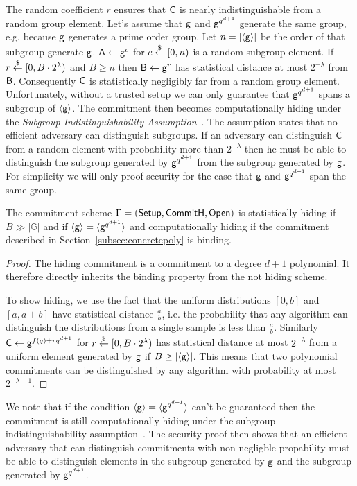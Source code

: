 The random coefficient $r$ ensures that $\mathsf{C}$ is nearly indistinguishable from a random group element. Let's assume that $\mathsf{g}$ and $\mathsf{g}^{q^{d+1}}$ generate the same group, e.g. because $\mathsf{g}$ generates a prime order group. Let $n=|\langle \mathsf{g}\rangle|$ be the order of that subgroup generate $\mathsf{g}$. $\mathsf{A}\gets\mathsf{g}^c$ for $c\overset{\$}{\gets} [0,n)$ is a random subgroup element. If $r \overset{\$}{\gets} [0,B\cdot 2^\lambda)$ and $B\geq n$ then $\mathsf{B}\gets \mathsf{g}^r$ has statistical distance at most $2^{-\lambda}$ from $\mathsf{B}$. Consequently $\mathsf{C}$ is statistically negligibly far from a random group element. 
 Unfortunately, without a trusted setup we can only guarantee that $\mathsf{g}^{q^{d+1}}$ spans a subgroup of $\langle \mathsf{g} \rangle$. The commitment then becomes computationally hiding under the \emph{Subgroup Indistinguishability Assumption}~\cite{C:BraGol10}. The assumption states that no efficient adversary can distinguish subgroups. If an adversary can distinguish $\mathsf{C}$ from a random element with probability more than $2^{-\lambda}$ then he must be able to distinguish the subgroup generated by $\mathsf{g}^{q^{d+1}}$ from the subgroup generated by $\mathsf{g}$. For simplicity we will only proof security for the case that $\mathsf{g}$ and $\mathsf{g}^{q^{d+1}}$ span the same group.
\begin{theorem}
The commitment scheme $\Gamma = (\textsf{{Setup}}, \textsf{{CommitH}}, \textsf{{Open}})$ is statistically hiding if $B \gg |\mathbb{G}|$ and if $\langle \mathsf{g} \rangle = \langle \mathsf{g}^{q^{d+1}} \rangle$ and computationally hiding if the commitment described in Section~\ref{subsec:concretepoly} is binding.
\end{theorem}

\begin{proof}
The hiding commitment is a commitment to a degree $d+1$ polynomial. It therefore directly inherits the binding property from the not hiding scheme.

To show hiding, we use the fact that the uniform distributions $[0,b]$ and $[a,a+b]$ have statistical distance $\frac{a}{b}$, i.e. the probability that any algorithm can distinguish the distributions from a single sample is less than $\frac{a}{b}$. Similarly $\mathsf{C}\gets\mathsf{g}^{f(q)+rq^{d+1}}$ for $r\overset{\$}{\gets}[0,B\cdot 2^{\lambda})$ has statistical distance at most $2^{-\lambda}$ from a uniform element generated by $\mathsf{g}$ if $B\geq |\langle \mathsf{g}\rangle|$. This means that two polynomial commitments can be distinguished by any algorithm with probability at most $2^{-\lambda+1}$.
\end{proof}
We note that if the condition $\langle \mathsf{g} \rangle = \langle \mathsf{g}^{q^{d+1}} \rangle$ can't be guaranteed then the commitment is still computationally hiding under the subgroup indistinguishability assumption~\cite{C:BraGol10}. The security proof then shows that an efficient adversary that can distinguish commitments with non-negligble propability must be able to distinguish elements in the subgroup generated by $\mathsf{g}$ and the subgroup generated by $\mathsf{g}^{q^{d+1}}$.

